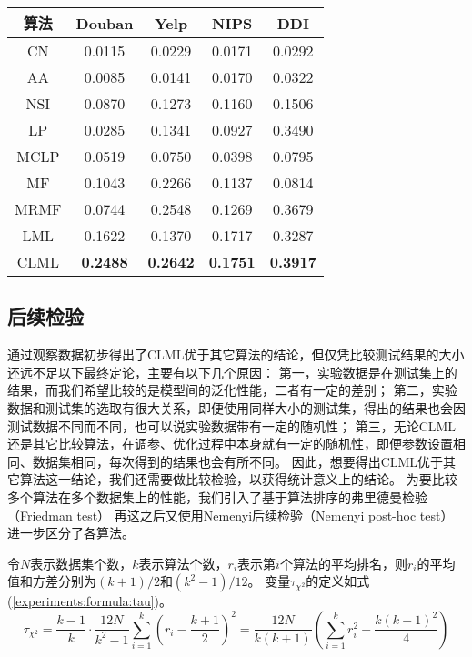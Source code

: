 \begin{center}
    \begin{tabular}{ccccc} \hline
        算法 &	Douban & Yelp & NIPS & DDI \\ \hline
        CN  & 0.0115 & 0.0229 & 0.0171 & 0.0292 \\
        AA  & 0.0085 & 0.0141 & 0.0170 & 0.0322 \\
        NSI & 0.0870 & 0.1273 & 0.1160 & 0.1506 \\
        LP	& 0.0285 & 0.1341 & 0.0927 & 0.3490 \\
        MCLP& 0.0519 & 0.0750 & 0.0398 & 0.0795 \\
        MF  & 0.1043 & 0.2266 & 0.1137 & 0.0814 \\
        MRMF& 0.0744 & 0.2548 & 0.1269 & 0.3679 \\ \hline
        LML & 0.1622 & 0.1370 & 0.1717 & 0.3287 \\
        CLML& \bfseries 0.2488 & \bfseries 0.2642 & \bfseries 0.1751 & \bfseries 0.3917 \\ \hline
    \end{tabular}
    \label{experiments:table:aupr}
\end{center}

\subsection{后续检验}

通过观察数据初步得出了CLML优于其它算法的结论，但仅凭比较测试结果的大小还远不足以下最终定论，主要有以下几个原因：
第一，实验数据是在测试集上的结果，而我们希望比较的是模型间的泛化性能，二者有一定的差别；
第二，实验数据和测试集的选取有很大关系，即便使用同样大小的测试集，得出的结果也会因测试数据不同而不同，也可以说实验数据带有一定的随机性；
第三，无论CLML还是其它比较算法，在调参、优化过程中本身就有一定的随机性，即便参数设置相同、数据集相同，每次得到的结果也会有所不同。
因此，想要得出CLML优于其它算法这一结论，我们还需要做比较检验，以获得统计意义上的结论。
为要比较多个算法在多个数据集上的性能，我们引入了基于算法排序的弗里德曼检验（Friedman test）
再这之后又使用Nemenyi后续检验（Nemenyi post-hoc test）进一步区分了各算法\cite{yang2015evaluating}\cite{demvsar2006statistical}。


令$N$表示数据集个数，$k$表示算法个数，$r_i$表示第$i$个算法的平均排名，则$r_i$的平均值和方差分别为$(k+1)/2$和$(k^2-1)/12$。
变量$\tau_{\chi^2}$的定义如式(\ref{experiments:formula:tau})。
\begin{equation}
    \tau_{\chi^2} =\frac{k-1}{k}\cdot\frac{12N}{k^2-1}\sum_{i=1}^k(r_i-\frac{k+1}{2})^2 =\frac{12N}{k(k+1)}(\sum_{i=1}^kr_i^2-\frac{k(k+1)^2}{4})
    \label{experiments:formula:tau}
\end{equation}

